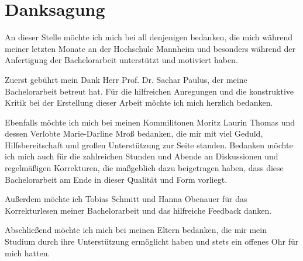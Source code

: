 \chapter*{Danksagung}
An dieser Stelle möchte ich mich bei all denjenigen bedanken, die mich während meiner letzten Monate an der Hochschule Mannheim und besonders während der Anfertigung der Bachelorarbeit unterstützt und motiviert haben.

Zuerst gebührt mein Dank Herr Prof. Dr. Sachar Paulus, der meine Bachelorarbeit betreut hat. Für die hilfreichen Anregungen und die konstruktive Kritik bei der Erstellung dieser Arbeit möchte ich mich herzlich bedanken.

Ebenfalls möchte ich mich bei meinen Kommilitonen Moritz Laurin Thomas und dessen Verlobte Marie-Darline Mroß bedanken, die mir mit viel Geduld, Hilfsbereitschaft und großen Unterstützung zur Seite standen. Bedanken möchte ich mich auch für die zahlreichen Stunden und Abende an Diskussionen und regelmäßigen Korrekturen, die maßgeblich dazu beigetragen haben, dass diese Bachelorarbeit am Ende in dieser Qualität und Form vorliegt.

Außerdem möchte ich Tobias Schmitt und Hanna Obenauer für das Korrekturlesen meiner Bachelorarbeit und das hilfreiche Feedback danken.

Abschließend möchte ich mich bei meinen Eltern bedanken, die mir mein Studium durch ihre Unterstützung ermöglicht haben und stets ein offenes Ohr für mich hatten.